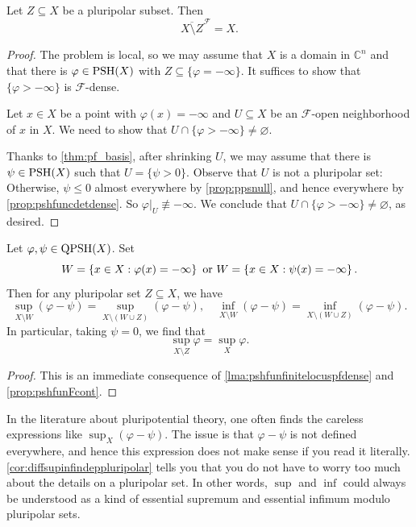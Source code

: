 \begin{lemma}\label{lma:pshfunfinitelocuspfdense}
    Let $Z\subseteq X$ be a pluripolar subset. Then
    \[
    \overline{X\setminus Z}^{\mathcal{F}}=X.
    \]
\end{lemma}
\begin{proof}
    The problem is local, so we may assume that $X$ is a domain in $\mathbb{C}^n$ and that there is $\varphi\in \mathrm{PSH}(X)$ with $Z\subseteq\{\varphi=-\infty\}$. It suffices to show that $\{\varphi>-\infty\}$ is $\mathcal{F}$-dense.

    Let $x\in X$ be a point with $\varphi(x)=-\infty$ and $U\subseteq X$ be an $\mathcal{F}$-open neighborhood of $x$ in $X$. We need to show that $U\cap \{\varphi>-\infty\}\neq \varnothing$.

    Thanks to \cref{thm:pf_basis}, after shrinking $U$, we may assume that there is $\psi\in \mathrm{PSH}(X)$ such that $U=\{\psi>0\}$. Observe that $U$ is not a pluripolar set: Otherwise, $\psi\leq 0$ almost everywhere by \cref{prop:ppsnull}, and hence everywhere by \cref{prop:pshfuncdetdense}. So $\varphi|_U\not\equiv -\infty$. We conclude that $U\cap \{\varphi>-\infty\}\neq \varnothing$, as desired.
\end{proof}

\begin{corollary}\label{cor:diffsupinfindeppluripolar}
    Let $\varphi,\psi\in \mathrm{QPSH}(X)$. Set
    \[
    W=\left\{x\in X:\varphi(x)=-\infty\right\}\textup{ or }W=\left\{x\in X:\psi(x)=-\infty\right\}.
    \]
    Then for any pluripolar set $Z\subseteq X$, we have
    \[
    \sup_{X\setminus W}(\varphi-\psi) =\sup_{X\setminus (W\cup Z)}(\varphi-\psi),\quad \inf_{X\setminus W}(\varphi-\psi) =\inf_{X\setminus (W\cup Z)}(\varphi-\psi).
    \]
    In particular, taking $\psi=0$, we find that
    \[
    \sup_{X\setminus Z}\varphi=\sup_X \varphi.
    \]
\end{corollary}
\begin{proof}
    This is an immediate consequence of \cref{lma:pshfunfinitelocuspfdense} and \cref{prop:pshfunFcont}.
\end{proof}

In the literature about pluripotential theory, one often finds the careless expressions like $\sup_X (\varphi-\psi)$. The issue is that $\varphi-\psi$ is not defined everywhere, and hence this expression does not make sense if you read it literally. \cref{cor:diffsupinfindeppluripolar} tells you that you do not have to worry too much about the details on a pluripolar set. In other words, $\sup$ and $\inf$ could always be understood as a kind of essential supremum and essential infimum modulo pluripolar sets.

